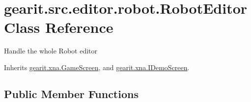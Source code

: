 \hypertarget{classgearit_1_1src_1_1editor_1_1robot_1_1_robot_editor}{\section{gearit.\+src.\+editor.\+robot.\+Robot\+Editor Class Reference}
\label{classgearit_1_1src_1_1editor_1_1robot_1_1_robot_editor}
}


Handle the whole Robot editor  




Inherits \hyperlink{classgearit_1_1xna_1_1_game_screen}{gearit.\+xna.\+Game\+Screen}, and \hyperlink{interfacegearit_1_1xna_1_1_i_demo_screen}{gearit.\+xna.\+I\+Demo\+Screen}.

\subsection*{Public Member Functions}
